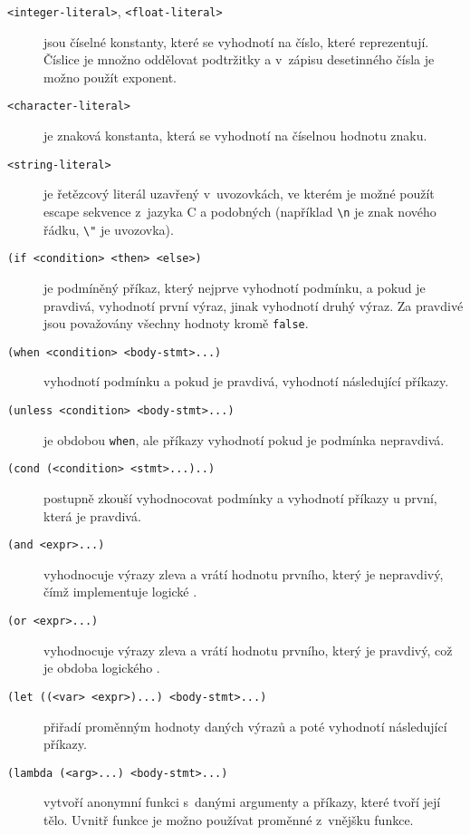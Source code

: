 \begin{description}
  \item[\texttt{<integer-literal>}, \texttt{<float-literal>}] jsou číselné
    konstanty, které se vyhodnotí na číslo, které reprezentují. Číslice je
    množno oddělovat podtržitky a v~zápisu desetinného čísla je možno použít
    exponent.

  \item[\texttt{<character-literal>}] je znaková konstanta, která se vyhodnotí
    na číselnou hodnotu znaku.

  \item[\texttt{<string-literal>}] je řetězcový literál uzavřený v~uvozovkách,
    ve kterém je možné použít escape sekvence z~jazyka C a podobných
    (například \texttt{\textbackslash{}n} je znak nového řádku,
    \texttt{\textbackslash{}"} je uvozovka).

  \item[\texttt{(if <condition> <then> <else>)}] je podmíněný příkaz, který
    nejprve vyhodnotí podmínku, a pokud je pravdivá, vyhodnotí první výraz,
    jinak vyhodnotí druhý výraz. Za pravdivé jsou považovány všechny hodnoty
    kromě \texttt{false}.

  \item[\texttt{(when <condition> <body-stmt>...)}] vyhodnotí podmínku a pokud
    je pravdivá, vyhodnotí následující příkazy. 

  \item[\texttt{(unless <condition> <body-stmt>...)}] je obdobou \texttt{when},
    ale příkazy vyhodnotí pokud je podmínka nepravdivá.

  \item[\texttt{(cond (<condition> <stmt>...)..)}] postupně zkouší vyhodnocovat
    podmínky a vyhodnotí příkazy u první, která je pravdivá.

  \item[\texttt{(and <expr>...)}] vyhodnocuje výrazy zleva a vrátí hodnotu
    prvního, který je nepravdivý, čímž implementuje logické .

  \item[\texttt{(or <expr>...)}] vyhodnocuje výrazy zleva a vrátí hodnotu
    prvního, který je pravdivý, což je obdoba logického .

  \item[\texttt{(let ((<var> <expr>)...) <body-stmt>...)}] přiřadí proměnným
    hodnoty daných výrazů a poté vyhodnotí následující příkazy.

  \item[\texttt{(lambda (<arg>...) <body-stmt>...)}] vytvoří anonymní funkci
    s~danými argumenty a příkazy, které tvoří její tělo. Uvnitř funkce je možno
    používat proměnné z~vnějšku funkce.


\end{description}
